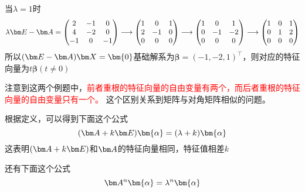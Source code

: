 \begin{solution}
    当$\lambda = 1$时
    \[
        \lambda \mat{E} - \mat{A} =
        \begin{pmatrix}
            2  & -1 & 0  \\
            4  & -2 & 0  \\
            -1 & 0  & -1
        \end{pmatrix}
        \longrightarrow
        \begin{pmatrix}
            1 & 0  & 1 \\
            2 & -1 & 0 \\
            0 & 0  & 0
        \end{pmatrix}
        \longrightarrow
        \begin{pmatrix}
            1 & 0  & 1  \\
            0 & -1 & -2 \\
            0 & 0  & 0
        \end{pmatrix}
        \longrightarrow
        \begin{pmatrix}
            1 & 0 & 1 \\
            0 & 1 & 2 \\
            0 & 0 & 0
        \end{pmatrix}
    \]
    所以$(\mat{E}-\mat{A})\mat{X}=\bm{0}$基础解系为$\bm{\beta}=(-1,-2,1)^\intercal$，则对应的特征向量为$t\bm{\beta} (t\neq 0)$
\end{solution}

注意到这两个例题中，\textcolor{red}{前者重根的特征向量的自由变量有两个，而后者重根的特征向量的自由变量只有一个。}
这个区别关系到矩阵与对角矩阵相似的问题。

根据定义，可以得到下面这个公式
\begin{equation}
    (\mat{A}+k\mat{E})\bm{\alpha} = (\lambda + k)\bm{\alpha}
\end{equation}
这表明$(\mat{A}+k\mat{E})$和$\mat{A}$的特征向量相同，特征值相差$k$

还有下面这个公式
\begin{equation}
    \mat{A}^n\bm{\alpha} = \lambda^n\bm{\alpha}
\end{equation}

